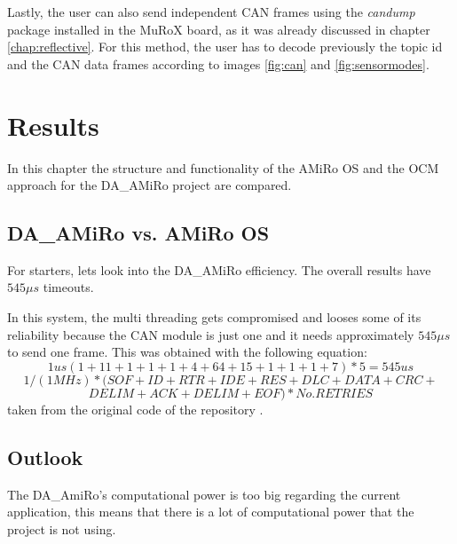 \documentclass[12pt]{report}%
\begin{document}

Lastly, the user can also send independent CAN frames using the \textit{candump} package installed in the MuRoX board, as it was already discussed in chapter \ref{chap:reflective}. For this method, the user has to decode previously the topic id and the CAN data frames according to images \ref{fig:can} and \ref{fig:sensormodes}.

\chapter{Results}
In this chapter the structure and functionality of the AMiRo OS and the OCM approach for the DA\_AMiRo project are compared.

\section{DA\_AMiRo vs. AMiRo OS}

For starters, lets look into the DA\_AMiRo efficiency. The overall results have $545\mu s$ timeouts.

In this system, the multi threading gets compromised and looses some of its reliability because the CAN module is just one and it needs approximately $545\mu s$ to send one frame. This was obtained with the following equation: $$1 us   (1+11+1+1+1+4+64+15+1+1+1+7)*5= 545 us$$ $$1/(1MHz)*(SOF+ID+RTR+IDE+RES+DLC+DATA+CRC+$$ $$DELIM+ACK+DELIM+EOF)*No. RETRIES$$
taken from the original code of the repository \cite{AMiRo_Wiki}.

\section{Outlook}
The DA\_AmiRo's computational power is too big regarding the current application, this means that there is a lot of computational power that the project is not using.


\printbibliography
\nocite{*}
\end{document}
